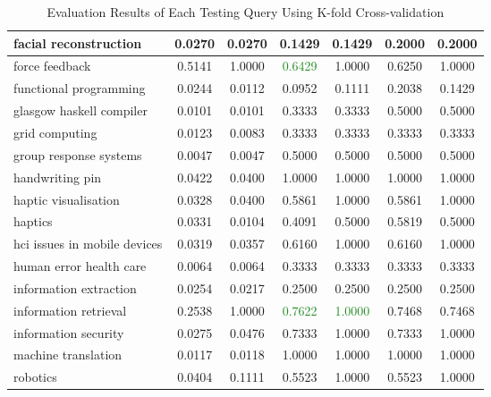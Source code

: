 \begin{table}
\begin{tabular}{|l|c|c|c|c|c|c|}
\hline facial reconstruction & 0.0270 & 0.0270 & 0.1429 & 0.1429 & 0.2000 & 0.2000 \\
\hline force feedback & 0.5141 & 1.0000 & \textcolor{ForestGreen}{0.6429} & 1.0000 & 0.6250 & 1.0000 \\
\hline functional programming & 0.0244 & 0.0112 & 0.0952 & 0.1111 & 0.2038 & 0.1429 \\
\hline glasgow haskell compiler & 0.0101 & 0.0101 & 0.3333 & 0.3333 & 0.5000 & 0.5000 \\
\hline grid computing & 0.0123 & 0.0083 & 0.3333 & 0.3333 & 0.3333 & 0.3333 \\
\hline group response systems & 0.0047 & 0.0047 & 0.5000 & 0.5000 & 0.5000 & 0.5000 \\
\hline handwriting pin & 0.0422 & 0.0400 & 1.0000 & 1.0000 & 1.0000 & 1.0000 \\
\hline haptic visualisation & 0.0328 & 0.0400 & 0.5861 & 1.0000 & 0.5861 & 1.0000 \\
\hline haptics & 0.0331 & 0.0104 & 0.4091 & 0.5000 & 0.5819 & 0.5000 \\
\hline hci issues in mobile devices & 0.0319 & 0.0357 & 0.6160 & 1.0000 & 0.6160 & 1.0000 \\
\hline human error health care & 0.0064 & 0.0064 & 0.3333 & 0.3333 & 0.3333 & 0.3333 \\
\hline information extraction & 0.0254 & 0.0217 & 0.2500 & 0.2500 & 0.2500 & 0.2500 \\
\hline information retrieval & 0.2538 & 1.0000 & \textcolor{ForestGreen}{0.7622} & \textcolor{ForestGreen}{1.0000} & 0.7468 & 0.7468 \\
\hline information security & 0.0275 & 0.0476 & 0.7333 & 1.0000 & 0.7333 & 1.0000 \\
\hline machine translation & 0.0117 & 0.0118 & 1.0000 & 1.0000 & 1.0000 & 1.0000 \\
\hline robotics & 0.0404 & 0.1111 & 0.5523 & 1.0000 & 0.5523 & 1.0000 \\
\hline
\end{tabular}
\caption{Evaluation Results of Each Testing Query Using K-fold Cross-validation} \label{table:kfoldqueryresult}
\end{table}


